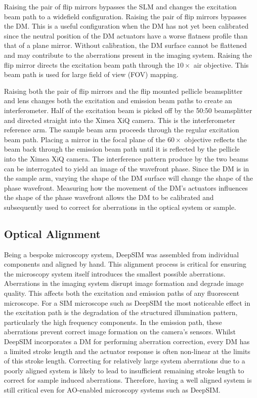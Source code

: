 Raising the  pair of flip mirrors bypasses the SLM and changes the excitation beam path to a widefield configuration. Raising the  pair of flip mirrors bypasses the DM. This is a useful configuration when the DM has not yet been calibrated since the neutral position of the DM actuators have a worse flatness profile than that of a plane mirror. Without calibration, the DM surface cannot be flattened and may contribute to the aberrations present in the imaging system. Raising the  flip mirror directs the excitation beam path through the $10 \times$ air objective. This beam path is used for large field of view (FOV) mapping.

Raising both the  pair of flip mirrors and the 
flip mounted pellicle beamsplitter and lens changes both the
excitation and emission beam paths to create an interferometer. Half
of the excitation beam is picked off by the 50:50 beamsplitter and
directed straight into the Ximea XiQ camera. This is the
interferometer reference arm. The sample beam arm proceeds through the
regular excitation beam path. Placing a mirror in the focal plane of
the $60\times$ objective reflects the beam back through the emission
beam path until it is reflected by the pellicle into the Ximea XiQ
camera. The interference pattern produce by the two beams can be interrogated to yield an image of the wavefront phase. Since the DM is in the sample arm, varying the shape of the DM surface will change the shape of the phase wavefront. Measuring how the movement of the DM's actuators influences the shape of the phase wavefront allows the DM to be calibrated and subsequently used to correct for aberrations in the optical system or sample. 

\subsection{Optical Alignment}
\label{subsec:alignment}

Being a bespoke microscopy system, DeepSIM was assembled from individual components and aligned by hand. This alignment process is critical for ensuring the microscopy system itself introduces the smallest possible aberrations. Aberrations in the imaging system disrupt image formation and degrade image quality\cite{wyant1992basic}. This affects both the excitation and emission paths of any fluorescent microscope. For a SIM microscope such as DeepSIM the most noticeable effect in the excitation path is the degradation of the structured illumination pattern, particularly the high frequency components\cite{debarre2008adaptive,booth2015aberrations}. In the emission path, these aberrations prevent correct image formation on the camera’s sensors. Whilst DeepSIM incorporates a DM for performing aberration correction, every DM has a limited stroke length and the actuator response is often non-linear at the limits of this stroke length. Correcting for relatively large system aberrations due to a poorly aligned system is likely to lead to insufficient remaining stroke length to correct for sample induced aberrations. Therefore, having a well aligned system is still critical even for AO-enabled microscopy systems such as DeepSIM.

